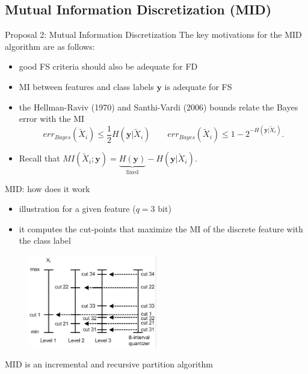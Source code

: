 \documentclass{beamer}
\begin{document}
\subsection[Mutual Information Discretization]{Mutual Information Discretization (MID)}
\begin{frame}{Proposal 2: Mutual Information Discretization}
The key motivations for the MID algorithm are as follows:
\begin{itemize}
	\vfill
	\item good FS criteria should also be adequate for FD

	\vfill
	\item MI between features and class labels $\mathbf{y}$ is adequate for FS

  \vfill
	\item the Hellman-Raviv (1970) and Santhi-Vardi (2006) bounds relate the Bayes error
	with the MI
	\begin{equation} \nonumber
	err_{Bayes}( \widetilde{X}_i ) \leq \frac{1}{2} H( \mathbf{y}|\widetilde{X}_i ) \qquad
	err_{Bayes}( \widetilde{X}_i ) \leq 1 - 2^{-H(\mathbf{y} | \widetilde{X}_i  )}.
	\end{equation}
	
  \vfill
	\item Recall that $MI(\widetilde{X}_i;\mathbf{y}) = \underbrace{H(\mathbf{y})}_{\mbox{fixed}} - H(\mathbf{y} | \widetilde{X}_i  )$.
\end{itemize}
\end{frame}


\begin{frame}{MID: how does it work}
\begin{itemize}
	\item illustration for a given feature ($q=3$ bit)
	\item it computes the cut-points that maximize the MI of the discrete feature with the class label
\end{itemize}
\begin{figure}
	\centering
	\includegraphics[width=0.5\textwidth]{fig2.png}
\end{figure}
{\small MID is an incremental and recursive partition algorithm}
\end{frame}
\end{document}
